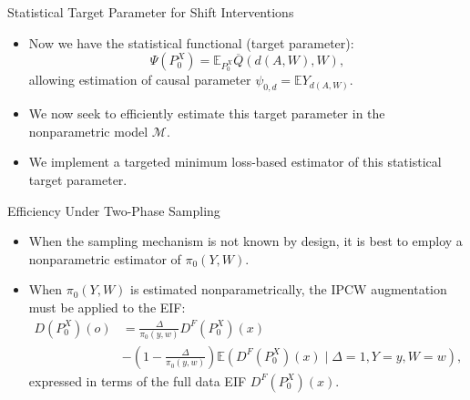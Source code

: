 \documentclass{beamer}
\newcommand{\E}{\mathbb{E}}
\newcommand{\M}{\mathcal{M}}
\begin{document}

\begin{frame}[c]{Statistical Target Parameter for Shift Interventions}

\begin{center}
\begin{itemize}
  \itemsep10pt
  \item Now we have the statistical functional (target parameter):
    \begin{equation*}
      \Psi(P_0^X) = \E_{P_0^X}{\overline{Q}(d(A, W), W)},
    \end{equation*}
    allowing estimation of causal parameter $\psi_{0,d} = \E Y_{d(A, W)}$.
  \item We now seek to efficiently estimate this target parameter in the
    nonparametric model $\M$.
  \item We implement a targeted minimum loss-based estimator of this statistical
    target parameter.
\end{itemize}
\end{center}


\end{frame}


\begin{frame}[c]{Efficiency Under Two-Phase Sampling}

\begin{center}
\begin{itemize}
  \itemsep10pt
  \item When the sampling mechanism is not known by design, it is best to employ
    a nonparametric estimator of $\pi_0(Y, W)$.
  \item When $\pi_0(Y, W)$ is estimated nonparametrically, the IPCW augmentation
    must be applied to the EIF:
    \begin{align*}
      D(P_0^X)(o) &= \frac{\Delta}{\pi_0(y, w)} D^F(P_0^X)(x) \\&- \left(1 -
        \frac{\Delta} {\pi_0(y, w)}\right)\E(D^F(P_0^X)(x) \mid
        \Delta = 1, Y = y, W = w),
    \end{align*}
    expressed in terms of the full data EIF $D^F(P_0^X)(x)$.
\end{itemize}
\end{center}

\note{
}

\end{frame}
\end{document}
